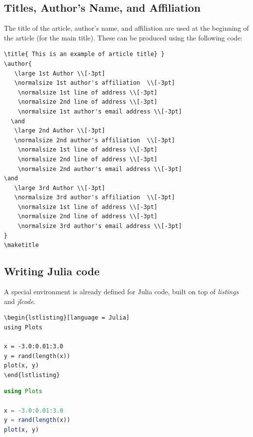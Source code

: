 \documentclass{juliacon}
\begin{document}
\subsection{Titles, Author's Name, and Affiliation}
\label{subsub:title_auth}
The title of the article, author's name, and affiliation are used at the
beginning of the article (for the main title). These can be produced
using the following code:

\begin{verbatim}
\title{ This is an example of article title} }
\author{
   \large 1st Author \\[-3pt]
   \normalsize 1st author's affiliation  \\[-3pt]
    \normalsize 1st line of address \\[-3pt]
    \normalsize 2nd line of address \\[-3pt]
    \normalsize	1st author's email address \\[-3pt]
  \and
   \large 2nd Author \\[-3pt]
   \normalsize 2nd author's affiliation  \\[-3pt]
    \normalsize 1st line of address \\[-3pt]
    \normalsize 2nd line of address \\[-3pt]
    \normalsize	2nd author's email address \\[-3pt]
\and
   \large 3rd Author \\[-3pt]
   \normalsize 3rd author's affiliation  \\[-3pt]
    \normalsize 1st line of address \\[-3pt]
    \normalsize 2nd line of address \\[-3pt]
    \normalsize	3rd author's email address \\[-3pt]
}
\maketitle
\end{verbatim}

\subsection{Writing Julia code}

A special environment is already defined for Julia code,
built on top of \textit{listings} and \textit{jlcode}.

\begin{verbatim}
\begin{lstlisting}[language = Julia]
using Plots

x = -3.0:0.01:3.0
y = rand(length(x))
plot(x, y)
\end{lstlisting}
\end{verbatim}
\begin{lstlisting}[language = Julia]
using Plots

x = -3.0:0.01:3.0
y = rand(length(x))
plot(x, y)
\end{lstlisting}
\end{document}
